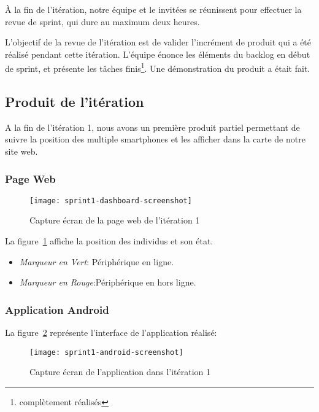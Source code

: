 À la fin de l'itération, notre équipe et le  invitées
se réunissent pour effectuer la revue de sprint, qui dure au maximum deux
heures.

L'objectif de la revue de l'itération est de valider l'incrément de produit qui
a été réalisé pendant cette itération. L'équipe énonce les éléments du backlog
en début de sprint, et présente les tâches finis\footnote{complètement
réalisés}. Une démonstration du produit a était fait.

\subsection{Produit de l'itération}

A la fin de l'itération 1, nous avons un première produit partiel permettant de
suivre la position des multiple smartphones et les afficher dans la carte de
notre site web.

\subsubsection{Page Web }
\begin{figure}[H]
    \centering
    \texttt{[image: sprint1-dashboard-screenshot]}
    \caption{Capture écran de la page web de l'itération 1}
\label{fig:sprint1-dashboard-screenshot}
\end{figure}

La figure~\ref{fig:sprint1-dashboard-screenshot} affiche la position des
individus et son état.

\begin{itemize}
    \item \textit{Marqueur en Vert}: Périphérique en ligne.
    \item \textit{Marqueur en Rouge}:Périphérique en hors ligne.
\end{itemize}



\subsubsection{Application Android}

La figure~\ref{fig:sprint1-android-screenshot} représente l'interface de
l'application réalisé:

\begin{figure}[H]
    \centering
    \texttt{[image: sprint1-android-screenshot]}
    \caption{Capture écran de l'application dans l'itération 1}
\label{fig:sprint1-android-screenshot}
\end{figure}


